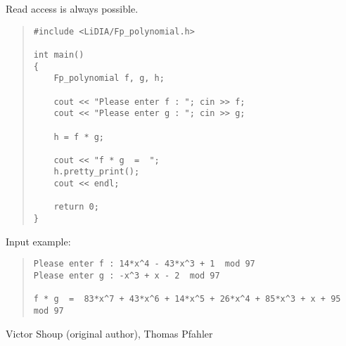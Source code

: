 Read access is always possible.



\EXAMPLES

\begin{quote}
\begin{verbatim}
#include <LiDIA/Fp_polynomial.h>

int main()
{
    Fp_polynomial f, g, h;

    cout << "Please enter f : "; cin >> f;
    cout << "Please enter g : "; cin >> g;

    h = f * g;

    cout << "f * g  =  ";
    h.pretty_print();
    cout << endl;

    return 0;
}
\end{verbatim}
\end{quote}

Input example:
\begin{quote}
\begin{verbatim}
Please enter f : 14*x^4 - 43*x^3 + 1  mod 97
Please enter g : -x^3 + x - 2  mod 97

f * g  =  83*x^7 + 43*x^6 + 14*x^5 + 26*x^4 + 85*x^3 + x + 95 mod 97
\end{verbatim}
\end{quote}



\AUTHOR

Victor Shoup (original author), Thomas Pfahler
